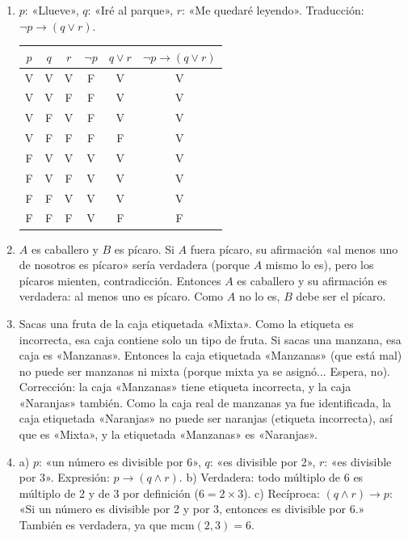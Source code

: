 \documentclass[12pt, letterpaper]{article}
\begin{document}
\begin{enumerate}[leftmargin=*, label=\textbf{\arabic*.}]
    \item $p$: «Llueve», $q$: «Iré al parque», $r$: «Me quedaré leyendo». Traducción: $\neg p \rightarrow (q \vee r)$.
          \begin{center}
            \small
            \begin{tabular}{ccc|c|c|c}
              $p$ & $q$ & $r$ & $\neg p$ & $q \vee r$ & $\neg p \rightarrow (q \vee r)$ \\
              \hline
              V   & V   & V   & F        & V          & V                               \\
              V   & V   & F   & F        & V          & V                               \\
              V   & F   & V   & F        & V          & V                               \\
              V   & F   & F   & F        & F          & V                               \\
              F   & V   & V   & V        & V          & V                               \\
              F   & V   & F   & V        & V          & V                               \\
              F   & F   & V   & V        & V          & V                               \\
              F   & F   & F   & V        & F          & F                               \\
            \end{tabular}
          \end{center}

    \item $A$ es caballero y $B$ es pícaro. Si $A$ fuera pícaro, su afirmación «al menos uno de nosotros es pícaro» sería verdadera (porque $A$ mismo lo es), pero los pícaros mienten, contradicción. Entonces $A$ es caballero y su afirmación es verdadera: al menos uno es pícaro. Como $A$ no lo es, $B$ debe ser el pícaro.

    \item Sacas una fruta de la caja etiquetada «Mixta». Como la etiqueta es incorrecta, esa caja contiene solo un tipo de fruta. Si sacas una manzana, esa caja es «Manzanas». Entonces la caja etiquetada «Manzanas» (que está mal) no puede ser manzanas ni mixta (porque mixta ya se asignó... Espera, no). Corrección: la caja «Manzanas» tiene etiqueta incorrecta, y la caja «Naranjas» también. Como la caja real de manzanas ya fue identificada, la caja etiquetada «Naranjas» no puede ser naranjas (etiqueta incorrecta), así que es «Mixta», y la etiquetada «Manzanas» es «Naranjas».

    \item a) $p$: «un número es divisible por 6», $q$: «es divisible por 2», $r$: «es divisible por 3». Expresión: $p \rightarrow (q \wedge r)$. \quad b) Verdadera: todo múltiplo de 6 es múltiplo de 2 y de 3 por definición ($6 = 2 \times 3$). \quad c) Recíproca: $(q \wedge r) \rightarrow p$: «Si un número es divisible por 2 y por 3, entonces es divisible por 6.» También es verdadera, ya que $\text{mcm}(2,3) = 6$.
  \end{enumerate}
\end{document}
